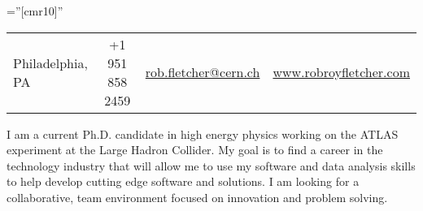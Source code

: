 \documentclass[a4paper,10pt]{article} %
\begin{document}
\pagestyle{empty} %

\font\fb=''[cmr10]'' %


\par{\bigskip\par} %
\begin{centering}
\begin{tabular}{ l | c | c | r}
Philadelphia, PA   &  +1 951 858 2459   &   \href{mailto:rob.fletcher@cern.ch}{rob.fletcher@cern.ch} & \href{www.robroyfletcher.com}{www.robroyfletcher.com}
\end{tabular} \par
\end{centering}

\vspace{5mm}
I am a current Ph.D. candidate in high energy physics working on the ATLAS experiment at the Large Hadron
Collider. My goal is to find a career in the technology industry that will allow me to use my software
and data analysis skills to help develop cutting edge software and solutions. I am looking for a collaborative,
team environment focused on innovation and problem solving.
\vspace{3mm}





\end{document}
